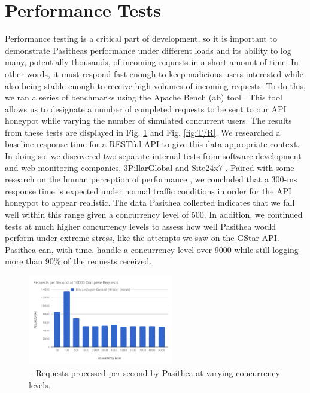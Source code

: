 
\section{Performance Tests} \label{performance}

Performance testing is a critical part of development, so it is important to demonstrate Pasitheas performance under different loads and its ability to log many, potentially thousands, of incoming requests in a short amount of time. In other words, it must respond fast enough to keep malicious users interested while also being stable enough to receive high volumes of incoming requests. To do this, we ran a series of benchmarks using the Apache Bench (ab) tool \cite{ab}. This tool allows us to designate a number of completed requests to be sent to our API honeypot while varying the number of simulated concurrent users. The results from these tests are displayed in Fig. \ref{fig:R/s} and Fig. \ref{fig:T/R}. We researched a baseline response time for a RESTful API to give this data appropriate context. In doing so, we discovered two separate internal tests from software development and web monitoring companies, 3PillarGlobal \cite{3Pillar} and Site24x7 \cite{site24x7}. Paired with some research on the human perception of performance \cite{performance}, we concluded that a 300-ms response time is expected under normal traffic conditions in order for the API honeypot to appear realistic. The data Pasithea collected indicates that we fall well within this range given a concurrency level of 500. In addition, we continued tests at much higher concurrency levels to assess how well Pasithea would perform under extreme stress, like the attempts we saw on the GStar API. Pasithea can, with time, handle a concurrency level over 9000 while still logging more than 90\% of the requests received.

\begin{figure}[ht]
\centering
\includegraphics[width=2.5in]{images/RequestsperSecond.png} 
\caption{-- Requests processed per second by Pasithea at varying concurrency levels.}
\label{fig:R/s}
\end{figure}

